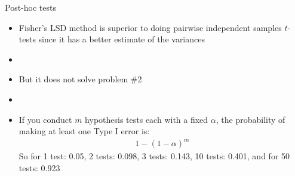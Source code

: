 \documentclass[xcolor=dvipsnames]{beamer}
\begin{document}
\begin{frame}{Post-hoc tests}
\begin{itemize}
	\item Fisher's LSD method is superior to doing pairwise independent samples $t$-tests since it has a better estimate of the variances
	\item[]
	\item But it does not solve problem \#2
	\item[]
	\item If you conduct $m$ hypothesis tests each with a fixed $\alpha$, the probability of making at least one Type I error is: 
	\begin{gather*}
		1-(1-\alpha)^m
	\end{gather*}
	So for 1 test: 0.05, 2 tests: 0.098, 3 tests: 0.143, 10 tests: 0.401, and for 50 tests: 0.923
\end{itemize}
\end{frame}
\end{document}
